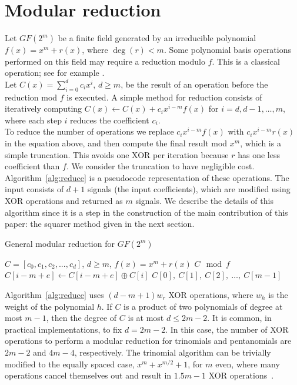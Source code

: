 \section{Modular reduction} \label{modrec}

Let $GF(2^m)$ be a finite field generated by an irreducible polynomial $f(x) = x^m + r(x)$, where $\deg(r) < m$. Some polynomial basis operations performed on this field may require a reduction modulo $f$. This is a classical operation; see for example \cite[Chapter~2.3.5]{hankerson2006guide}.\\

Let $C(x) = \sum_{i=0}^{d} c_i x^i$, $d \geq m$, be the result of an operation before the reduction mod $f$ is executed. A simple method for reduction consists of iteratively computing $C(x) \leftarrow C(x) + c_{i} x^{i-m} f(x)$ for $i = d, d-1, \ldots, m$, where each step $i$ reduces the coefficient $c_{i}$.\\

To reduce the number of operations we replace $c_{i} x^{i-m} f(x)$ with $c_{i} x^{i-m} r(x)$ in the equation above, and then compute the final result mod $x^m$, which is a simple truncation. This avoids one XOR per iteration because $r$ has one less coefficient than $f$. We consider the truncation to have negligible cost. Algorithm~\ref{alg:reduce} is a pseudocode representation of these operations. The input consists of $d+1$ signals (the input coefficients), which are modified using XOR operations and returned as $m$ signals. We describe the details of this algorithm since it is a step in the construction of the main contribution of this paper: the squarer method given in the next section.

\begin{algorithm}
\caption{General modular reduction for $GF(2^m)$}
\label{alg:reduce}
\begin{algorithmic}[1]
\REQUIRE $C = [c_0, c_1, c_2, ..., c_d]$, $d \geq m$, $f(x) = x^m + r(x)$
\ENSURE $C \mod f$
\STATE $C[i-m+e] \leftarrow C[i-m+e] \oplus C[i]$ \label{alg:reduce:op}
\ENDFOR
\ENDFOR
\RETURN $C[0],~C[1],~C[2],~\ldots,~C[m-1]$
\end{algorithmic}
\end{algorithm}

Algorithm~\ref{alg:reduce} uses $(d-m+1)w_r$ XOR operations, where $w_h$ is the weight of the polynomial $h$. If $C$ is a product of two polynomials of degree at most $m-1$, then the degree of $C$ is at most $d \leq 2m-2$. It is common, in practical implementations, to fix $d=2m-2$. In this case, the number of XOR operations to perform a modular reduction for trinomials and pentanomials are $2m-2$ and $4m-4$, respectively. The trinomial algorithm can be trivially modified to the equally spaced case, $x^m+x^{m/2}+1$, for $m$ even, where many operations cancel themselves out and result in $1.5 m - 1$ XOR operations~\cite{wu2002bit}.\\

